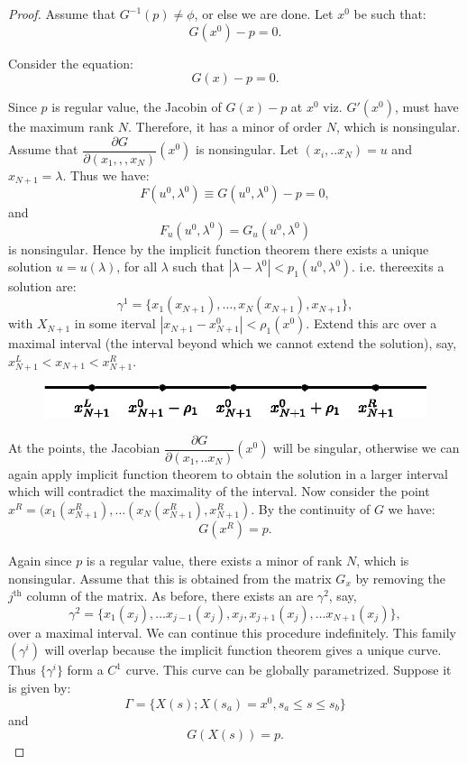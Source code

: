 \begin{proof}
Assume that $G^{-1}(p) \neq \phi$, or else we are done. Let $x^0$ be
such that:  
$$
G(x^0) - p = 0.
$$

Consider the equation:
$$
G(x) - p = 0.
$$

Since $p$ is regular value, the Jacobin of $G(x)-p$ at $x^0$
viz. $G'(x^0)$, must have the maximum rank $N$. Therefore, it has a
minor of order $N$, which is nonsingular. Assume that $\dfrac{\partial
  G}{\partial(x_1, , ,x_N)} (x^0)$ is nonsingular. Let $(x_i, ..x_N) =
u$ and $x_{N+1} = \lambda$. Thus we have: 
$$
F(u^0 , \lambda^0) \equiv G(u^0 , \lambda^0) - p = 0 ,
$$
and  
$$
F_u(u^0 , \lambda^0) = G_u(u^0 , \lambda^0) 
$$
is nonsingular. Hence by the implicit function theorem there exists a
unique solution $u = u(\lambda)$, for all $\lambda$ such that
$|\lambda - \lambda^0| < p_1(u^0,
\lambda^0)$. i.e. there\pageoriginale exits a solution are: 
$$
\gamma^1 = \{ x_1 (x_{N+1}), \ldots, x_N(x_{N+1}), x_{N+1} \}, 
$$
with $X_{N+1}$ in some iterval $|x_{N+1} -x^0_{N+1}| <
\rho_1(x^0)$. Extend this arc over a maximal interval (the interval
beyond which we cannot extend the solution), say, $x^L_{N+1} < x_{N+1}
< x^R_{N+1}$. 
\begin{figure}[H]
\centering
\includegraphics{vol79-fig/nonum.eps}
\end{figure}

At the points, the Jacobian $\dfrac{\partial G}{\partial (x_1, ..x_N)}
(x^0)$ will be singular, otherwise we can again apply implicit
function theorem to obtain the solution in a larger interval which
will contradict the maximality of the interval. Now consider the point
$x^R = (x_1(x^R_{N+1}),\ldots (x_N(x^R_{N+1}), x^R_{N+1})$. By the
continuity of $G$ we have: 
$$
G(x^R) =p.
$$

Again since $p$ is a regular value, there exists a minor of rank $N$,
which is nonsingular. Assume that this is obtained from the matrix
$G_x$ by removing the $j^{\text{th}}$ column of the matrix. As before, there
exists an are $\gamma^2$, say, 
$$
\gamma^2 = \{ x_1 (x_j),\ldots x_{j-1}(x_j), x_j, x_{j+1} (x_j),\ldots
x_{N+1} (x_j) \},  
$$
over a maximal interval. We can continue this procedure
indefinitely. This family $(\gamma^i)$ will overlap because the
implicit function theorem gives a unique curve. Thus $\{ \gamma^i \}$
form a $C^1$ curve. This curve can be globally parametrized. Suppose
it is given by: 
$$
 \Gamma = \{ X(s); X(s_a) = x^0, s_a \leq s \leq s_b \}   
 $$\pageoriginale
and 
$$
G(X(s)) = p.
$$


\end{proof}
